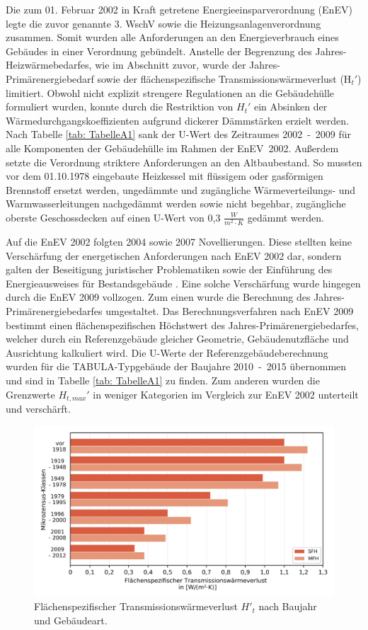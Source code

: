 Die zum 01. Februar 2002 in Kraft getretene Energieeinsparverordnung (EnEV) legte die zuvor genannte 3. WschV sowie die Heizungsanlagenverordnung zusammen. 
Somit wurden alle Anforderungen an den Energieverbrauch eines Gebäudes in einer Verordnung gebündelt.
Anstelle der Begrenzung des Jahres-Heizwärmebedarfes, wie im Abschnitt zuvor, wurde der Jahres-Primärenergiebedarf sowie der flächenspezifische Transmissionswärmeverlust (H\(_t'\)) limitiert.
Obwohl nicht explizit strengere Regulationen an die Gebäudehülle formuliert wurden, konnte durch die Restriktion von \(H_t'\) ein Absinken der Wärmedurchgangskoeffizienten aufgrund dickerer Dämmstärken erzielt werden.
Nach Tabelle \ref{tab: TabelleA1} sank der U-Wert des Zeitraumes \mbox{2002 - 2009} für alle Komponenten der Gebäudehülle im Rahmen der \mbox{EnEV 2002}.
Außerdem setzte die Verordnung striktere Anforderungen an den Altbaubestand. 
So mussten vor dem 01.10.1978 eingebaute Heizkessel mit flüssigem oder gasförmigen Brennstoff ersetzt werden, ungedämmte und zugängliche Wärmeverteilungs- und Warmwasserleitungen nachgedämmt werden sowie nicht begehbar, zugängliche oberste Geschossdecken auf einen U-Wert von 0,3 \(\frac{W}{m^2 \cdot K} \) gedämmt werden.

Auf die EnEV 2002 folgten 2004 sowie 2007 Novellierungen.
Diese stellten keine Verschärfung der energetischen Anforderungen nach EnEV 2002 dar, sondern galten der Beseitigung juristischer Problematiken sowie der Einführung des Energieausweises für Bestandsgebäude \cite{Wild.2015}.
Eine solche Verschärfung wurde hingegen durch die EnEV 2009 vollzogen.
Zum einen wurde die Berechnung des Jahres-Primärenergiebedarfes umgestaltet.
Das Berechnungsverfahren nach EnEV 2009 bestimmt einen flächenspezifischen Höchstwert des Jahres-Primärenergiebedarfes, welcher durch ein Referenzgebäude gleicher Geometrie, Gebäudenutzfläche und Ausrichtung kalkuliert wird.
Die U-Werte der Referenzgebäudeberechnung wurden für die TABULA-Typgebäude der Baujahre \mbox{2010 - 2015} übernommen und sind in Tabelle \ref{tab: TabelleA1} zu finden.
Zum anderen wurden die Grenzwerte \(H_{t, max}'\) in weniger Kategorien im Vergleich zur EnEV 2002 unterteilt und verschärft.

\begin{figure}[H]
	\centering
		\includegraphics{Pictures/TransmissionswaermekoeffizientBaujahr.jpg}
	\caption{Flächenspezifischer Transmissionswärmeverlust \(H'_t\) nach Baujahr und Gebäudeart. \cite{Bigalke.2016}}
	\label{fig: Abbildung221} 
\end{figure}

